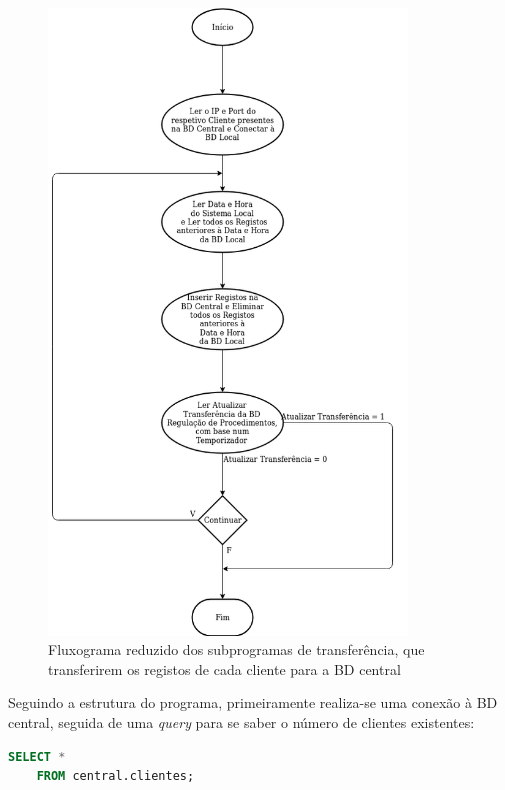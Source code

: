 \documentclass[11pt,twoside,a4paper]{report}
\begin{document}
\begin{figure}
	\vspace{-2.5cm}
	\begin{center}
		\includegraphics[width=0.85\textwidth]{fluxograma_simples_transferencia_subprograma01} %
		\caption[Fluxograma reduzido dos subprogramas de transferência]{Fluxograma reduzido dos subprogramas de transferência, que transferirem os registos de cada cliente para a BD central}
		\label{fig:transferencia_simples_subprograma}
	\end{center}
\end{figure}
Seguindo a estrutura do programa, primeiramente realiza-se uma conexão à BD central, seguida de uma \textit{query} para se saber o número de clientes existentes:
\begin{lstlisting}[language = SQL]
	SELECT *
	FROM central.clientes;
\end{lstlisting}
\end{document}
